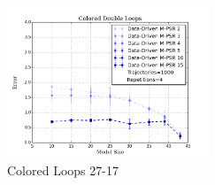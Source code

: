 \begin{figure}[ht!]
\centering
\includegraphics[width=60mm]{uCOREPICS/DLMO/numOpComparison.png}
\caption{Colored Loops 27-17\label{overflow}}
\end{figure}
